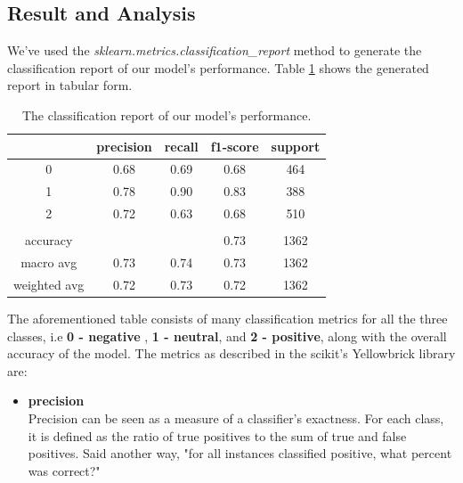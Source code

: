 \documentclass[a4paper, 12pt]{article}
\begin{document}
\begin{sloppypar}
  \subsection{Result and Analysis}
  
  We've used the \textit{sklearn.metrics.classification\_report} method to generate the classification report of our model's performance. Table \ref{report} shows the generated report in tabular form. 
  \begin{table}[H]
  \begin{center}
\begin{tabular}{|c|c|c|c|c|}
\hline
             & precision & recall & f1-score & support \\
             \hline
             \hline
0            & 0.68      & 0.69   & 0.68     & 464     \\
\hline
1            & 0.78      & 0.90   & 0.83     & 388     \\
\hline
2            & 0.72      & 0.63   & 0.68     & 510     \\
\hline
             &           &        &          &         \\
             \hline
accuracy     &           &        & 0.73     & 1362    \\
\hline
macro avg    & 0.73      & 0.74   & 0.73     & 1362    \\
\hline
weighted avg & 0.72      & 0.73   & 0.72     & 1362   \\
\hline
\end{tabular}
  \end{center}
  \caption{The classification report of our model's performance.\label{report}}
\end{table}

The aforementioned table consists of many classification metrics for all the three classes, i.e \textbf{0 - negative} , \textbf{1 - neutral}, and \textbf{2 - positive}, along with the overall accuracy of the model. The metrics as described in the scikit's Yellowbrick library are:
\begin{itemize}
\item{\textbf{precision} \\ 
Precision can be seen as a measure of a classifier's exactness. For each class, it is defined as the ratio of true positives to the sum of true and false positives. Said another way, "for all instances classified positive, what percent was correct?"}


\end{itemize}
\end{sloppypar}
\end{document}
